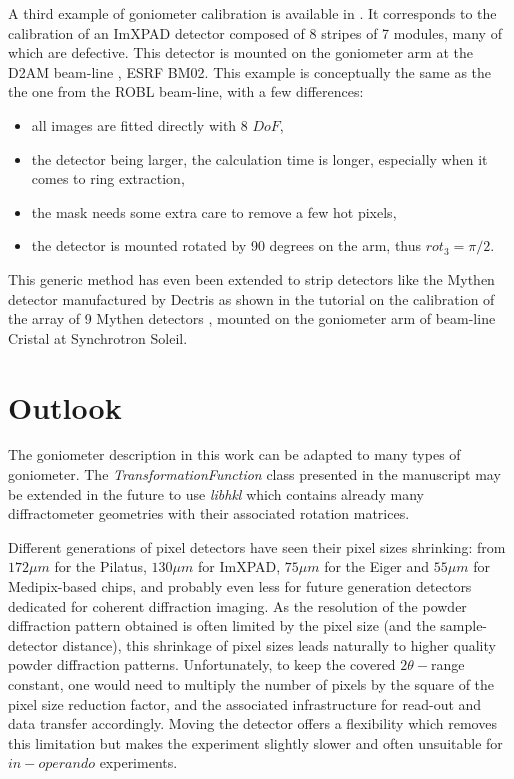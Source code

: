 \documentclass[preprint]{iucr}              %
\begin{document}
A third example of goniometer calibration is available in \cite{rotation_xpad}. 
It corresponds to the calibration of an ImXPAD detector \cite{BOUDET200341}
composed of 8 stripes of 7 modules, many of which are defective.
This detector is mounted on the goniometer arm at the D2AM beam-line
\cite{Ferrer:ri0008}, ESRF BM02. 
This example is conceptually the same as the the one from the ROBL beam-line,
with a few differences:
\begin{itemize}
  \item all images are fitted directly with 8 $DoF$,
  \item the detector being larger, the calculation time is
        longer, especially when it comes to ring extraction,
  \item the mask needs some extra care to remove a few hot pixels,
  \item the detector is mounted rotated by 90 degrees on the arm, thus $rot_3=\pi/2$.
\end{itemize}

This generic method has even been extended to strip detectors 
like the Mythen detector manufactured by Dectris as shown in the tutorial on the 
calibration of the array of 9 Mythen detectors \cite{rotation_mythen}, mounted on 
the goniometer arm of beam-line Cristal at Synchrotron Soleil.  

\section{Outlook}

The goniometer description in this work can be adapted to
many types of goniometer.
The \textit{TransformationFunction} class presented in the manuscript may be extended
in the future to use \textit{libhkl} \cite{libhkl} which contains already many
diffractometer geometries with their associated rotation matrices. 

Different generations of pixel detectors have seen their pixel sizes
shrinking:
from $172 \mu m$ for the Pilatus, $130 \mu m$ for ImXPAD, $75 \mu m$ for the
Eiger and $55 \mu m$ for Medipix-based chips, and probably even less for
future generation detectors dedicated for coherent diffraction imaging.
As the resolution of the powder diffraction pattern obtained is often limited by the
pixel size (and the sample-detector distance), this shrinkage of
pixel sizes leads naturally to higher quality powder
diffraction patterns.
Unfortunately, to keep the covered $2\theta-$range constant, one would need
to multiply the number of pixels by the square of the pixel size reduction
factor, and the associated infrastructure for read-out and data transfer
accordingly.
Moving the detector offers a flexibility which removes this
limitation but makes the experiment slightly slower and often unsuitable 
for $in-operando$ experiments.
\end{document}
